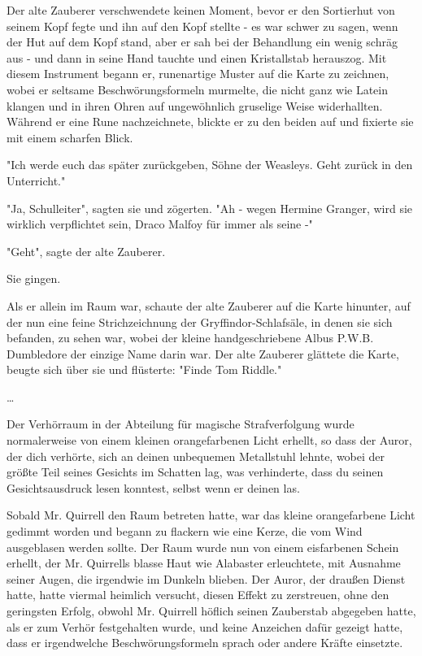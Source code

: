 {Der alte Zauberer verschwendete keinen Moment, bevor er den Sortierhut von seinem Kopf fegte und ihn auf den Kopf stellte - es war schwer zu sagen, wenn der Hut auf dem Kopf stand, aber er sah bei der Behandlung ein wenig schräg aus - und dann in seine Hand tauchte und einen Kristallstab herauszog. Mit diesem Instrument begann er, runenartige Muster auf die Karte zu zeichnen, wobei er seltsame Beschwörungsformeln murmelte, die nicht ganz wie Latein klangen und in ihren Ohren auf ungewöhnlich gruselige Weise widerhallten. Während er eine Rune nachzeichnete, blickte er zu den beiden auf und fixierte sie mit einem scharfen Blick.

"Ich werde euch das später zurückgeben, Söhne der Weasleys. Geht zurück in den Unterricht."

"Ja, Schulleiter", sagten sie und zögerten. "Ah - wegen Hermine Granger, wird sie wirklich verpflichtet sein, Draco Malfoy für immer als seine -"

"Geht", sagte der alte Zauberer.

Sie gingen.

Als er allein im Raum war, schaute der alte Zauberer auf die Karte hinunter, auf der nun eine feine Strichzeichnung der Gryffindor-Schlafsäle, in denen sie sich befanden, zu sehen war, wobei der kleine handgeschriebene Albus P.W.B. Dumbledore der einzige Name darin war. Der alte Zauberer glättete die Karte, beugte sich über sie und flüsterte: "Finde Tom Riddle."

…

Der Verhörraum in der Abteilung für magische Strafverfolgung wurde normalerweise von einem kleinen orangefarbenen Licht erhellt, so dass der Auror, der dich verhörte, sich an deinen unbequemen Metallstuhl lehnte, wobei der größte Teil seines Gesichts im Schatten lag, was verhinderte, dass du seinen Gesichtsausdruck lesen konntest, selbst wenn er deinen las.

Sobald Mr. Quirrell den Raum betreten hatte, war das kleine orangefarbene Licht gedimmt worden und begann zu flackern wie eine Kerze, die vom Wind ausgeblasen werden sollte. Der Raum wurde nun von einem eisfarbenen Schein erhellt, der Mr. Quirrells blasse Haut wie Alabaster erleuchtete, mit Ausnahme seiner Augen, die irgendwie im Dunkeln blieben. Der Auror, der draußen Dienst hatte, hatte viermal heimlich versucht, diesen Effekt zu zerstreuen, ohne den geringsten Erfolg, obwohl Mr. Quirrell höflich seinen Zauberstab abgegeben hatte, als er zum Verhör festgehalten wurde, und keine Anzeichen dafür gezeigt hatte, dass er irgendwelche Beschwörungsformeln sprach oder andere Kräfte einsetzte.

}

